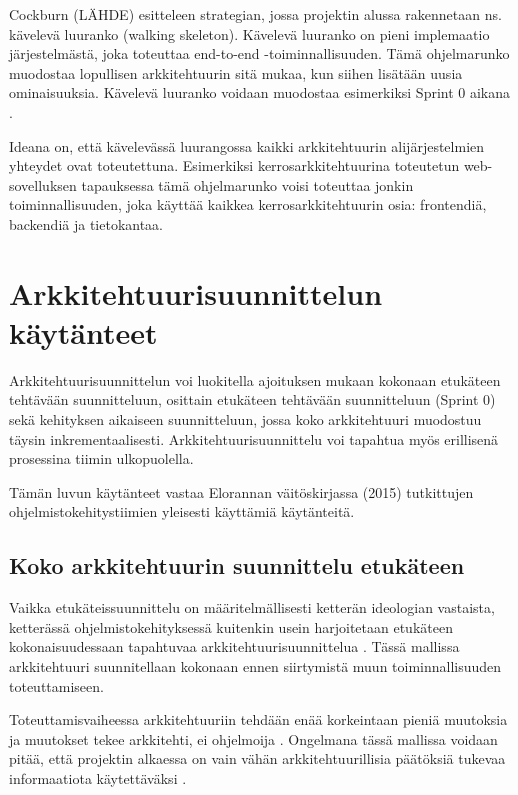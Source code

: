 Cockburn (LÄHDE) esitteleen strategian, jossa projektin alussa rakennetaan ns. kävelevä luuranko (walking skeleton). Kävelevä luuranko on pieni implemaatio järjestelmästä, joka toteuttaa end-to-end -toiminnallisuuden. Tämä ohjelmarunko muodostaa lopullisen arkkitehtuurin sitä mukaa, kun siihen lisätään uusia ominaisuuksia. Kävelevä luuranko voidaan muodostaa esimerkiksi Sprint 0 aikana \citep{eloranta2015techniques}.

Ideana on, että kävelevässä luurangossa kaikki arkkitehtuurin alijärjestelmien yhteydet ovat toteutettuna. Esimerkiksi kerrosarkkitehtuurina toteutetun web-sovelluksen tapauksessa tämä ohjelmarunko voisi toteuttaa jonkin toiminnallisuuden, joka käyttää kaikkea kerrosarkkitehtuurin osia: frontendiä, backendiä ja tietokantaa.


\chapter{Arkkitehtuurisuunnittelun käytänteet}

Arkkitehtuurisuunnittelun voi luokitella ajoituksen mukaan kokonaan etukäteen tehtävään suunnitteluun, osittain etukäteen tehtävään suunnitteluun (Sprint 0) sekä kehityksen aikaiseen suunnitteluun, jossa koko arkkitehtuuri muodostuu täysin inkrementaalisesti. Arkkitehtuurisuunnittelu voi tapahtua myös erillisenä prosessina tiimin ulkopuolella.

Tämän luvun käytänteet vastaa Elorannan väitöskirjassa (2015) tutkittujen ohjelmistokehitystiimien yleisesti käyttämiä käytänteitä.

\section{Koko arkkitehtuurin suunnittelu etukäteen}
Vaikka etukäteissuunnittelu on määritelmällisesti ketterän ideologian vastaista, ketterässä ohjelmistokehityksessä kuitenkin usein harjoitetaan etukäteen kokonaisuudessaan tapahtuvaa arkkitehtuurisuunnittelua \citep{rost_distilling_2015, eloranta2015techniques}. Tässä mallissa arkkitehtuuri suunnitellaan kokonaan ennen siirtymistä muun toiminnallisuuden toteuttamiseen. 

Toteuttamisvaiheessa arkkitehtuuriin tehdään enää korkeintaan pieniä muutoksia ja muutokset tekee arkkitehti, ei ohjelmoija \citep{eloranta2015techniques}. Ongelmana tässä mallissa voidaan pitää, että projektin alkaessa on vain vähän arkkitehtuurillisia päätöksiä tukevaa informaatiota käytettäväksi \citep{waterman_how_2015}.

